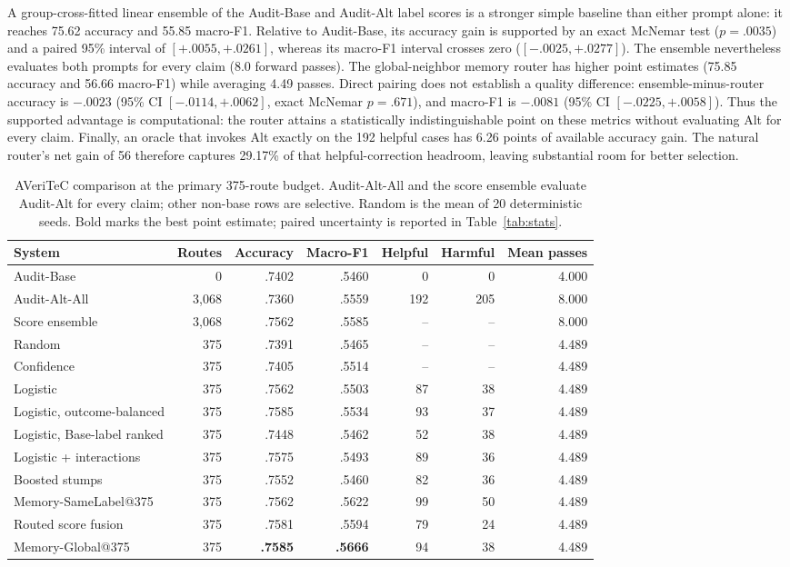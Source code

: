\documentclass[runningheads]{llncs}
\begin{document}
A group-cross-fitted linear ensemble of the Audit-Base and Audit-Alt label scores is a
stronger simple baseline than either prompt alone: it reaches 75.62 accuracy
and 55.85 macro-F1. Relative to Audit-Base, its accuracy gain is supported by an
exact McNemar test ($p=.0035$) and a paired 95\% interval of
$[+.0055,+.0261]$, whereas its macro-F1 interval crosses zero
($[-.0025,+.0277]$).  The ensemble nevertheless evaluates both prompts for
every claim (8.0 forward passes).  The global-neighbor memory router has
higher point estimates (75.85 accuracy and 56.66 macro-F1) while averaging
4.49 passes.  Direct pairing does not establish a quality difference:
ensemble-minus-router accuracy is $-.0023$ (95\% CI
$[-.0114,+.0062]$, exact McNemar $p=.671$), and macro-F1 is $-.0081$
(95\% CI $[-.0225,+.0058]$).  Thus the supported advantage is computational:
the router attains a statistically indistinguishable point on these metrics
without evaluating Alt for every claim.  Finally, an oracle that invokes Alt
exactly on the 192 helpful cases has 6.26 points of available accuracy gain.
The natural router's net gain of 56 therefore captures 29.17\% of that
helpful-correction headroom, leaving substantial room for better selection.

\begin{table}[t]
\caption{AVeriTeC comparison at the primary 375-route budget. Audit-Alt-All and the
score ensemble evaluate Audit-Alt for every claim; other non-base rows are selective.
Random is the mean of 20 deterministic seeds. Bold marks the best point
estimate; paired uncertainty is reported in Table~\ref{tab:stats}.}
\label{tab:matched}
\centering\small
\begin{tabular}{lrrrrrr}
\toprule
System & Routes & Accuracy & Macro-F1 & Helpful & Harmful & Mean passes \\
\midrule
Audit-Base & 0 & .7402 & .5460 & 0 & 0 & 4.000 \\
Audit-Alt-All & 3,068 & .7360 & .5559 & 192 & 205 & 8.000 \\
Score ensemble & 3,068 & .7562 & .5585 & -- & -- & 8.000 \\
Random & 375 & .7391 & .5465 & -- & -- & 4.489 \\
Confidence & 375 & .7405 & .5514 & -- & -- & 4.489 \\
Logistic & 375 & .7562 & .5503 & 87 & 38 & 4.489 \\
Logistic, outcome-balanced & 375 & .7585 & .5534 & 93 & 37 & 4.489 \\
Logistic, Base-label ranked & 375 & .7448 & .5462 & 52 & 38 & 4.489 \\
Logistic + interactions & 375 & .7575 & .5493 & 89 & 36 & 4.489 \\
Boosted stumps & 375 & .7552 & .5460 & 82 & 36 & 4.489 \\
Memory-SameLabel@375 & 375 & .7562 & .5622 & 99 & 50 & 4.489 \\
Routed score fusion & 375 & .7581 & .5594 & 79 & 24 & 4.489 \\
Memory-Global@375 & 375 & \textbf{.7585} & \textbf{.5666} & 94 & 38 & 4.489 \\
\bottomrule
\end{tabular}
\end{table}
\end{document}
